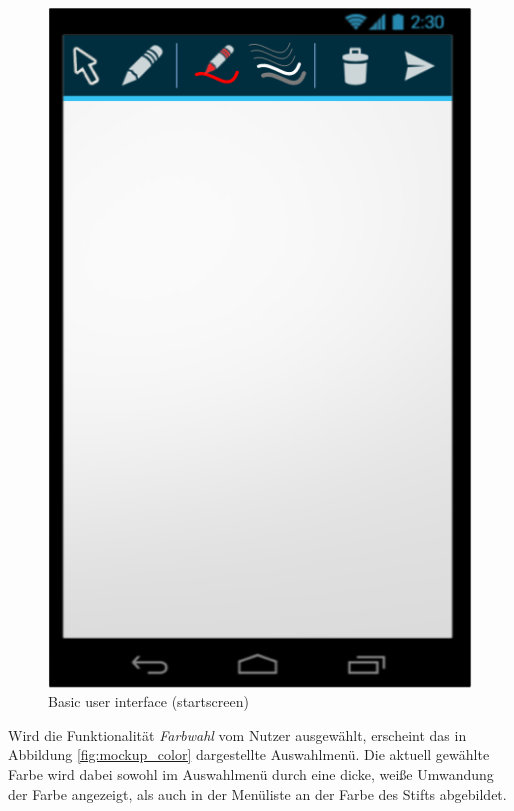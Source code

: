 \documentclass{chi-ext}
\begin{document}
\begin{figure}
  \centering
  \includegraphics[width=\linewidth]{img/android/mockup_startscreen.png}
  \caption{Basic user interface (startscreen)}
  \label{fig:mockup_startscreen}
\end{figure}

Wird die Funktionalität \textit{Farbwahl} vom Nutzer ausgewählt, erscheint das in Abbildung \ref{fig:mockup_color} dargestellte Auswahlmenü. Die aktuell gewählte Farbe wird dabei sowohl im Auswahlmenü durch eine dicke, weiße Umwandung der Farbe angezeigt, als auch in der Menüliste an der Farbe des Stifts abgebildet.
\end{document}
